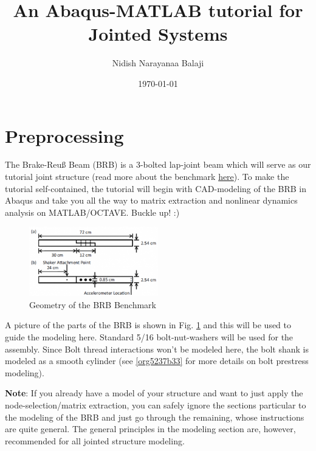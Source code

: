 \documentclass[11pt]{article}
\author{Nidish Narayanaa Balaji}
\date{\today}
\title{An Abaqus-MATLAB tutorial for Jointed Systems}
\begin{document}
\maketitle
\tableofcontents

\pagebreak

\section{Preprocessing}
\label{sec:org0eb26e7}

The Brake-Reuß Beam (BRB) is a 3-bolted lap-joint beam which will serve as our tutorial joint structure (read more about the benchmark \href{https://jointmechanics.org/index.php/Benchmarks\#The\_Brake-Reu\%C3\%9F\_Beams}{here}).
To make the tutorial self-contained, the tutorial will begin with CAD-modeling of the BRB in Abaqus and take you all the way to matrix extraction and nonlinear dynamics analysis on MATLAB/OCTAVE.
Buckle up! :)

\begin{figure}[htbp]
\centering
\includegraphics[width=0.5\textwidth]{./figs/300px-BRB.png}
\caption{\label{fig:org17753b6}Geometry of the BRB Benchmark}
\end{figure}

A picture of the parts of the BRB is shown in Fig. \ref{fig:org17753b6} and this will be used to guide the modeling here.
Standard 5/16 bolt-nut-washers will be used for the assembly. Since Bolt thread interactions won't be modeled here, the bolt shank is modeled as a smooth cylinder (see \ref{org5237b33} for more details on bolt prestress modeling).

\textbf{Note}: If you already have a model of your structure and want to just apply the node-selection/matrix extraction, you can safely ignore the sections particular to the modeling of the BRB and just go through the remaining, whose instructions are quite general.
The general principles in the modeling section are, however, recommended for all jointed structure modeling.
\end{document}
